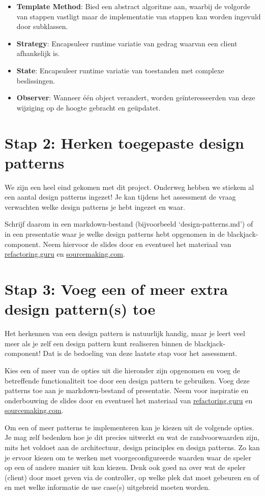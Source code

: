 \begin{itemize}
    \item \textbf{Template Method}:
    Bied een abstract algoritme aan, 
    waarbij de volgorde van stappen vastligt 
    maar de implementatie van stappen kan 
    worden ingevuld door subklassen.
    \item \textbf{Strategy}:
    Encapsuleer runtime variatie van gedrag 
    waarvan een client afhankelijk is.
    \item \textbf{State}:
    Encapsuleer runtime variatie van toestanden 
    met complexe beslissingen.
    \item \textbf{Observer}:
    Wanneer één object verandert, 
    worden geïnteresseerden van deze 
    wijziging op de hoogte gebracht en geüpdatet.
\end{itemize}

\section{Stap 2: Herken toegepaste design patterns}
We zijn een heel eind gekomen met dit project. Onderweg hebben we stiekem al 
een aantal design patterns ingezet! Je kan tijdens het assessment de vraag 
verwachten welke design patterns je hebt ingezet en waar. 

Schrijf daarom in een markdown-bestand (bijvoorbeeld `design-patterns.md')
of in een presentatie waar je welke design patterns hebt opgenomen in de blackjack-component. 
Neem hiervoor de slides door en eventueel het materiaal van 
\url{refactoring.guru} en \url{sourcemaking.com}.

\newpage
\section{Stap 3: Voeg een of meer extra design pattern(s) toe}
Het herkennen van een design pattern is natuurlijk handig, maar je leert veel meer 
als je zelf een design pattern kunt realiseren binnen de blackjack-component!
Dat is de bedoeling van deze laatste stap voor het assessment.

Kies een of meer van de opties uit die hieronder zijn opgenomen en voeg de 
betreffende functionaliteit toe door een design pattern te gebruiken. 
Voeg deze patterns toe aan je markdown-bestand of presentatie.
Neem voor inspiratie en onderbouwing de slides door 
en eventueel het materiaal van \url{refactoring.guru} en \url{sourcemaking.com}.

Om een of meer patterns te implementeren kan je kiezen uit de volgende opties.
Je mag zelf bedenken hoe je dit precies uitwerkt en wat de randvoorwaarden zijn,
mits het voldoet aan de architectuur, design principles en design patterns.
Zo kan je ervoor kiezen om te werken met voorgeconfigureerde waarden waar de speler
op een of andere manier uit kan kiezen.
Denk ook goed na over wat de speler (client) door moet geven via de controller,
op welke plek dat moet gebeuren en of en met welke informatie de use case(s) 
uitgebreid moeten worden.

